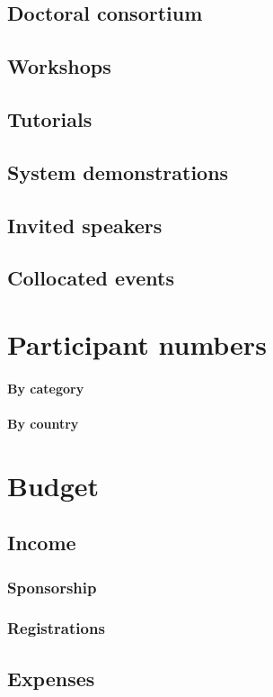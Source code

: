 \documentclass[11pt,a4paper]{article}
\begin{document}
\subsection{Doctoral consortium}
\subsection{Workshops}
\subsection{Tutorials}
\subsection{System demonstrations}
\subsection{Invited speakers}
\subsection{Collocated events}

\section{Participant numbers} 
\paragraph{By category}
\paragraph{By country}

\section{Budget}
\subsection{Income}
  \subsubsection{Sponsorship}
  \subsubsection{Registrations}
\subsection{Expenses}
\end{document}
